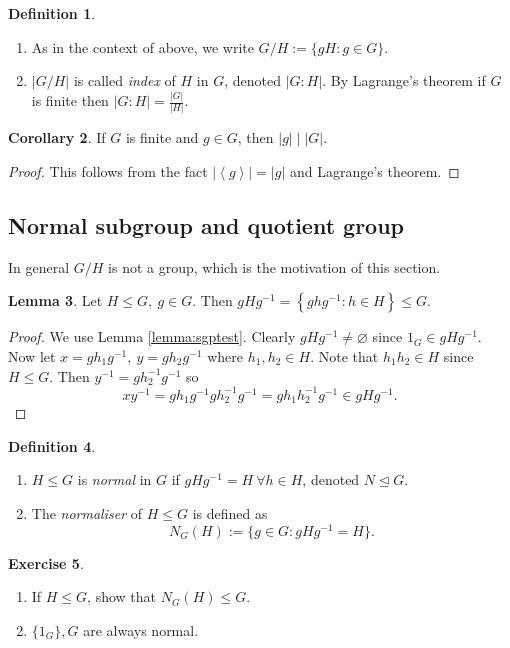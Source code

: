 \documentclass[a4paper]{article}
\newcommand{\la}{\left\langle}
\newcommand{\ra}{\right\rangle}
\theoremstyle{definition}
\newtheorem{defn}{Definition}[subsection]
\newtheorem{lemma}[defn]{Lemma}
\newtheorem{coro}[defn]{Corollary}
\newtheorem{exe}[defn]{Exercise}
\begin{document}
\begin{defn}
\begin{enumerate}
\item As in the context of above, we write $G/H:=\{gH:g\in G\}$.
\item $|G/H|$ is called \textit{index} of $H$ in $G$, denoted $|G:H|$. By Lagrange's theorem if $G$ is finite then $|G:H|=\frac{|G|}{|H|}$.
\end{enumerate}
\end{defn}
\begin{coro}
If $G$ is finite and $g\in G$, then $|g|\mid |G|$.
\end{coro}
\begin{proof}
This follows from the fact $|\la g\ra |=|g|$ and Lagrange's theorem.
\end{proof}

\subsection{Normal subgroup and quotient group}
In general $G/H$ is not a group, which is the motivation of this section.
\begin{lemma}
Let $H\leq G,\ g\in G$. Then $gHg^{-1}=\left\{ghg^{-1}:h\in H\right\} \leq G$.
\end{lemma}
\begin{proof}
We use Lemma \ref{lemma:sgptest}. Clearly $gHg^{-1}\neq \varnothing$ since $1_G\in gHg^{-1}$. Now let $x=gh_1g^{-1},\ y=gh_2g^{-1}$ where $h_1,h_2\in H$. Note that $h_1h_2\in H$ since $H\leq G$. Then $y^{-1}=gh_2^{-1}g^{-1}$ so
\[
xy^{-1}=gh_1g^{-1}gh_2^{-1}g^{-1}=gh_1h_2^{-1}g^{-1} \in gHg^{-1}.
\]
\end{proof}
\begin{defn}
\begin{enumerate}
\item $H\leq G$ is \textit{normal} in $G$ if $gHg^{-1}=H \ \forall h\in H$, denoted $N\unlhd G$.
\item The \textit{normaliser} of $H\leq G$ is defined as
\[
N_G(H):=\{g\in G:gHg^{-1}=H\}.
\]
\end{enumerate}
\end{defn}
\begin{exe}
\begin{enumerate}
\item If $H\leq G$, show that $N_G(H)\leq G$.
\item $\{1_G\},G$ are always normal.
\end{enumerate}
\end{exe}
\end{document}
